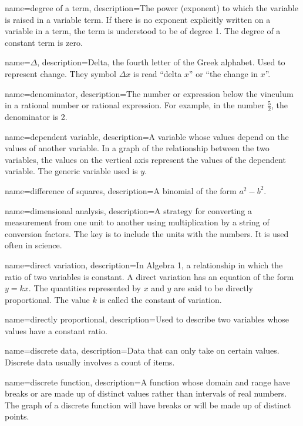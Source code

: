  {
	name=degree of a term,
	description={The power (exponent) to which the variable is raised in a variable term. If there is no exponent explicitly written on a variable in a term, the term is understood to be of degree 1. The degree of a constant term is zero.}
}

{
	name={$\Delta$},
	description={Delta, the fourth letter of the Greek alphabet. Used to represent change. They symbol $\Delta x$ is read ``delta $x$'' or ``the change in $x$''.}
}

 {
	name=denominator,
	description={The number or expression below the \gls{vinculum} in a \gls{rational number} or \gls{rational expression}. For example, in the number $\frac{5}{2}$, the denominator is 2.}
}

 {
	name=dependent variable,
	description={A variable whose values depend on the values of another variable. In a graph of the relationship between the two variables, the values on the vertical axis represent the values of the dependent variable. The generic variable used is $y$.}
}

 {
	name=difference of squares,
	description={A binomial of the form $a^2-b^2$.}
}

 {
	name=dimensional analysis,
	description={A strategy for converting a measurement from one unit to another using multiplication by a string of conversion factors. The key is to include the units with the numbers. It is used often in science.}
}

 {
	name=direct variation,
	description={In Algebra 1, a relationship in which the ratio of two variables is constant. A direct variation has an equation of the form $y = kx$. The quantities represented by $x$ and $y$ are said to be \gls{directly proportional}. The value $k$ is called the \gls{constant of variation}.}
}

 {
	name=directly proportional,
	description={Used to describe two variables whose values have a constant ratio.}
}

 {
	name=discrete data,
	description={Data that can only take on certain values. Discrete data usually involves a count of items.}
}

 {
	name=discrete function,
	description={A function whose domain and range have breaks or are made up of distinct values rather than intervals of real numbers. The graph of a discrete function will have breaks or will be made up of distinct points.}
}

